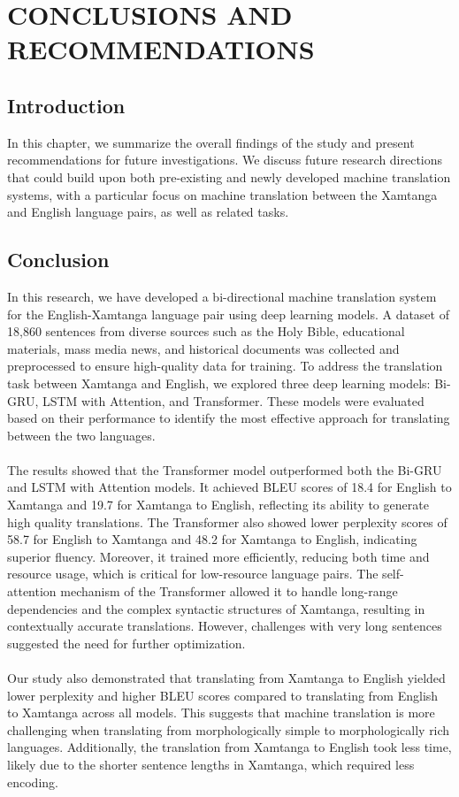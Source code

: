 \chapter{CONCLUSIONS AND RECOMMENDATIONS}
\label{ch5}
\section{Introduction}
In this chapter, we summarize the overall findings of the study and present recommendations for future investigations. We discuss future research directions that could build upon both pre-existing and newly developed machine translation systems, with a particular focus on machine translation between the Xamtanga and English language pairs, as well as related tasks.
\section{Conclusion}
In this research, we have developed a bi-directional machine translation system for the English-Xamtanga language pair using deep learning models. A dataset of 18,860 sentences from diverse sources such as the Holy Bible, educational materials, mass media news, and historical documents was collected and preprocessed to ensure high-quality data for training. To address the translation task between Xamtanga and English, we explored three deep learning models: Bi-GRU, LSTM with Attention, and Transformer. These models were evaluated based on their performance to identify the most effective approach for translating between the two languages.\\\\
The results showed that the Transformer model outperformed both the Bi-GRU and LSTM with Attention models. It achieved BLEU scores of 18.4 for English to Xamtanga and 19.7 for Xamtanga to English, reflecting its ability to generate high quality translations. The Transformer also showed lower perplexity scores of 58.7 for English to Xamtanga and 48.2 for Xamtanga to English, indicating superior fluency. Moreover, it trained more efficiently, reducing both time and resource usage, which is critical for low-resource language pairs. The self-attention mechanism of the Transformer allowed it to handle long-range dependencies and the complex syntactic structures of Xamtanga, resulting in contextually accurate translations. However, challenges with very long sentences suggested the need for further optimization.\\\\
Our study also demonstrated that translating from Xamtanga to English yielded lower perplexity and higher BLEU scores compared to translating from English to Xamtanga across all models. This suggests that machine translation is more challenging when translating from morphologically simple to morphologically rich languages. Additionally, the translation from Xamtanga to English took less time, likely due to the shorter sentence lengths in Xamtanga, which required less encoding.\\\\

